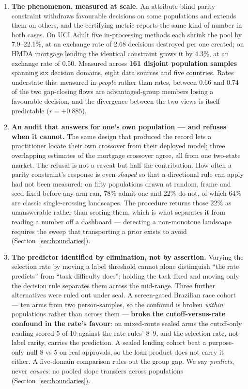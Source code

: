 \documentclass[9pt,conference]{IEEEtran}
\begin{document}
\begin{enumerate}
\item \textbf{The phenomenon, measured at scale.} An attribute-blind parity constraint
withdraws favourable decisions on some populations and extends them on others, and the
certifying metric reports the same kind of number in both cases. On UCI Adult five
in-processing methods each shrink the pool by 7.9--22.1\%, at an exchange rate of 2.68
decisions destroyed per one created; on HMDA mortgage lending the identical constraint grows
it by 4.3\%, at an exchange rate of 0.50. Measured across \textbf{161 disjoint population
samples} spanning six decision domains, eight data sources and five countries. Rates understate this: measured in \emph{people} rather than rates, between 0.66 and
0.74 of the two gap-closing flows are advantaged-group members losing a favourable decision, and the
divergence between the two views is itself predictable ($r = +0.885$).

\item \textbf{An audit that answers for one's own population --- and refuses when it
cannot.} The same design that produced the record lets a practitioner locate their own
crossover from their deployed model; three overlapping estimates of the mortgage crossover
agree, all from one two-state market. The refusal is not a caveat but half the contribution.
How often a parity constraint's response is even \emph{shaped} so that a directional rule
can apply had not been measured: on fifty populations drawn at random, frame and seed fixed
before any arm ran, 78\% admit one and 22\% do not, of which 64\% are classic
single-crossing landscapes. The procedure returns those 22\% as unanswerable rather than
scoring them, which is what separates it from reading a number off a dashboard --- detecting
a non-monotone landscape requires the sweep that transporting a prior exists to avoid
(Section~\ref{sec:boundaries}).

\item \textbf{The predictor identified by elimination, not by assertion.} Varying the
selection rate by moving a label threshold cannot alone distinguish ``the rate predicts''
from ``task difficulty does''; holding the task fixed and moving only the decision rule
separates them across the mid-range. Three further alternatives were ruled out under seal.
A screen-gated Brazilian race cohort --- ten arms from two person-samples, so the confound
is broken \emph{within} populations rather than across them --- \textbf{broke the
cutoff-versus-rate confound in the rate's favour}: on mixed-route sealed arms the
cutoff-only reading scored 5 of 10 against the rate rules' 8--9, and the selection rate,
not label rarity, carries the prediction. A sealed lending cohort beat a purpose-only null
8 vs 5 on real approvals, so the loan product does not carry it either. A five-domain
comparison rules out the group gap. We say \emph{predicts}, never \emph{causes}: no pooled
slope transfers across populations (Section~\ref{sec:boundaries}).


\end{enumerate}
\end{document}
